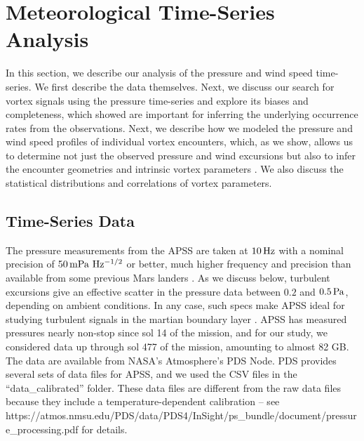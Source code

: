 \documentclass{aastex63}
\begin{document}
\section{Meteorological Time-Series Analysis}
\label{sec:Meteorological Time-Series Analysis}
In this section, we describe our analysis of the pressure and wind speed time-series. We first describe the data themselves. Next, we discuss our search for vortex signals using the pressure time-series and explore its biases and completeness, which \citet{2015JGRE..120..401J} showed are important for inferring the underlying occurrence rates from the observations. Next, we describe how we modeled the pressure and wind speed profiles of individual vortex encounters, which, as we show, allows us to determine not just the observed pressure and wind excursions but also to infer the encounter geometries and intrinsic vortex parameters \citep[\emph{cf.}][]{2016Icar..271..326L}. We also discuss the statistical distributions and correlations of vortex parameters. 

\subsection{Time-Series Data}
\label{sec:Time-Series Data}
The pressure measurements from the APSS are taken at $10\, {\rm Hz}$ with a nominal precision of $50\,{\rm mPa\ Hz^{-1/2}}$ or better, much higher frequency and precision than available from some previous Mars landers \citep[\emph{e.g.},][]{2010JGRE..115.0E16E}. As we discuss below, turbulent excursions give an effective scatter in the pressure data between $0.2$ and $0.5\,{\rm Pa}$, depending on ambient conditions. In any case, such specs make APSS ideal for studying turbulent signals in the martian boundary layer \citep{2018SSRv..214..109S}. APSS has measured pressures nearly non-stop since sol 14 of the mission, and for our study, we considered data up through sol 477 of the mission, amounting to almost 82 GB. The data are available from NASA's Atmosphere's PDS Node. PDS provides several sets of data files for APSS, and we used the CSV files in the ``data\_calibrated'' folder. These data files are different from the raw data files because they include a temperature-dependent calibration -- see https://atmos.nmsu.edu/PDS/data/PDS4/InSight/ps\_bundle/document/pressure\_processing.pdf for details.
\end{document}
